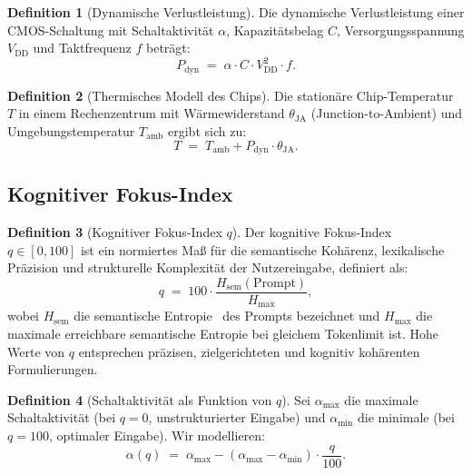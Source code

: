 ﻿\documentclass[a4paper,12pt]{article}
\theoremstyle{definition}
\newtheorem{definition}{Definition}
\begin{document}
\begin{definition}[Dynamische Verlustleistung]
Die dynamische Verlustleistung einer CMOS-Schaltung mit Schaltaktivität $\alpha$,
Kapazitätsbelag $C$, Versorgungsspannung $V_{\mathrm{DD}}$ und Taktfrequenz $f$ beträgt:
\[
P_{\mathrm{dyn}} \;=\; \alpha \cdot C \cdot V_{\mathrm{DD}}^2 \cdot f.
\]
\end{definition}

\begin{definition}[Thermisches Modell des Chips]
Die stationäre Chip-Temperatur $T$ in einem Rechenzentrum mit Wärmewiderstand
$\theta_{\mathrm{JA}}$ (Junction-to-Ambient) und Umgebungstemperatur $T_{\mathrm{amb}}$
ergibt sich zu:
\[
T \;=\; T_{\mathrm{amb}} + P_{\mathrm{dyn}} \cdot \theta_{\mathrm{JA}}.
\]
\end{definition}

\subsection{Kognitiver Fokus-Index}

\begin{definition}[Kognitiver Fokus-Index $q$]
Der kognitive Fokus-Index $q \in [0,100]$ ist ein normiertes Maß für die semantische
Kohärenz, lexikalische Präzision und strukturelle Komplexität der Nutzereingabe, definiert als:
\[
q \;=\; 100 \cdot \frac{H_{\mathrm{sem}}(\text{Prompt})}{H_{\mathrm{max}}},
\]
wobei $H_{\mathrm{sem}}$ die semantische Entropie~\cite{Shannon1948} des Prompts bezeichnet
und $H_{\mathrm{max}}$ die maximale erreichbare semantische Entropie bei gleichem
Tokenlimit ist. Hohe Werte von $q$ entsprechen präzisen, zielgerichteten und kognitiv
kohärenten Formulierungen.
\end{definition}

\begin{definition}[Schaltaktivität als Funktion von $q$]
\label{def:alpha_q}
Sei $\alpha_{\mathrm{max}}$ die maximale Schaltaktivität (bei $q=0$, unstrukturierter Eingabe)
und $\alpha_{\mathrm{min}}$ die minimale (bei $q=100$, optimaler Eingabe). Wir modellieren:
\[
\alpha(q) \;=\; \alpha_{\mathrm{max}} - (\alpha_{\mathrm{max}} - \alpha_{\mathrm{min}}) \cdot \frac{q}{100}.
\]
\end{definition}

\end{document}
